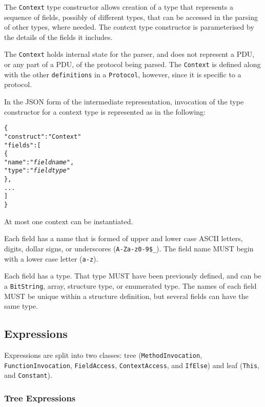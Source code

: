 \documentclass[10pt,twocolumn,a4paper]{article}
\newcommand{\code}[1]{\texttt{#1}}
\begin{document}
The \code{Context} type constructor allows creation of a type that
represents a sequence of fields, possibly of different types, that can be
accessed in the parsing of other types, where needed. The context type
constructor is parameterised by the details of the fields it includes.

The \code{Context} holds internal state for the parser, and does not
represent a PDU, or any part of a PDU, of the protocol being parsed.
The \code{Context} is defined along with the other \code{definitions}
in a \code{Protocol}, however, since it is specific to a protocol.

In the JSON form of the intermediate representation, invocation of the type
constructor for a context type is represented as in the following:
\footnotesize
\begin{alltt}
  \{
    "construct"   : "Context"
    "fields"      : [
      \{
        "name"    : "\emph{field name}",
        "type"    : "\emph{field type}"
      \},
      ...
    ]
  \}
\end{alltt}
\normalsize
At most one context can be instantiated.

Each field has a name that is formed of upper and lower case ASCII letters,
digits, dollar signs, or underscores (\code{A-Za-z0-9\$\_}). The field name
MUST begin with a lower case letter (\code{a-z}).

Each field has a type. That type MUST have been previously defined, and can
be a \code{BitString}, array, structure type, or enumerated type. The names
of each field MUST be unique within a structure definition, but several
fields can have the same type.

\subsection{Expressions}
\label{sec:expressions}

Expressions are split into two classes: 
tree (\code{MethodInvocation}, \code{FunctionInvocation}, \code{FieldAccess}, 
      \code{ContextAccess}, and \code{IfElse})
and 
leaf (\code{This}, and \code{Constant}).

\subsubsection{Tree Expressions}
\end{document}

